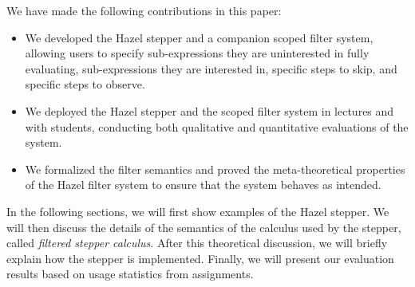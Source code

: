 
We have made the following contributions in this paper:
\begin{itemize}
  \item We developed the Hazel stepper and a companion scoped filter system,
    allowing users to specify sub-expressions they are uninterested in fully
    evaluating, sub-expressions they are interested in, specific steps to skip, and
    specific steps to observe.
  \item We deployed the Hazel stepper and the scoped filter system in
    lectures and with students, conducting both qualitative and quantitative
    evaluations of the system.
  \item We formalized the filter semantics and proved the meta-theoretical
    properties of the Hazel filter system to ensure that the system behaves as intended.
\end{itemize}

In the following sections, we will first show examples of the
Hazel stepper. We will then discuss the details of the semantics of
the calculus used by the stepper, called \emph{filtered stepper
  calculus}. After this theoretical discussion, we will briefly explain
how the stepper is implemented. Finally, we will present our
evaluation results based on usage statistics from assignments.


